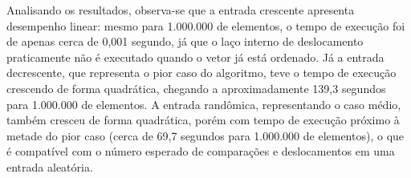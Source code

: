 \qquad Analisando os resultados, observa-se que a entrada crescente
apresenta desempenho linear: mesmo para 1.000.000 de elementos, o
tempo de execução foi de apenas cerca de 0,001 segundo, já que o
laço interno de deslocamento praticamente não é executado quando o
vetor já está ordenado. Já a entrada decrescente, que representa o
pior caso do algoritmo, teve o tempo de execução crescendo de forma
quadrática, chegando a aproximadamente 139,3 segundos para 1.000.000
de elementos. A entrada randômica, representando o caso médio,
também cresceu de forma quadrática, porém com tempo de execução
próximo à metade do pior caso (cerca de 69,7 segundos para 1.000.000
de elementos), o que é compatível com o número esperado de
comparações e deslocamentos em uma entrada aleatória.
